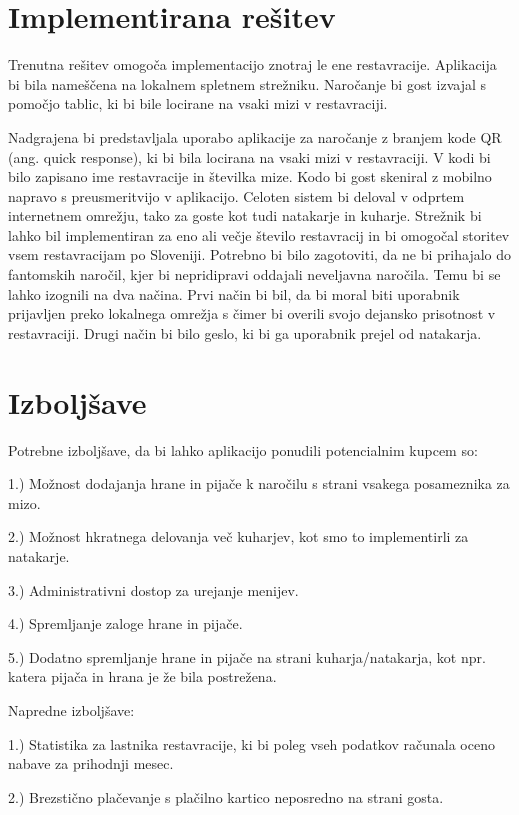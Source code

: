 \documentclass[a4paper, 12pt]{book}
\begin{document}
\section{Implementirana rešitev}

Trenutna rešitev omogoča implementacijo znotraj le ene restavracije. Aplikacija bi bila nameščena na lokalnem spletnem strežniku. Naročanje bi gost izvajal s pomočjo tablic, ki bi bile locirane na vsaki mizi v restavraciji. 

Nadgrajena bi predstavljala uporabo aplikacije za naročanje z branjem kode QR (ang. quick response), ki bi bila locirana na vsaki mizi v restavraciji. V kodi bi bilo zapisano ime restavracije in številka mize. Kodo bi gost skeniral z mobilno napravo s preusmeritvijo v aplikacijo. Celoten sistem bi deloval v odprtem internetnem omrežju, tako za goste kot tudi natakarje in kuharje. Strežnik bi lahko bil implementiran za eno ali večje število restavracij in bi omogočal storitev vsem restavracijam po Sloveniji. Potrebno bi bilo zagotoviti, da ne bi prihajalo do fantomskih naročil, kjer bi nepridipravi oddajali neveljavna naročila. Temu bi se lahko izognili na dva načina. Prvi način bi bil, da bi moral biti uporabnik prijavljen preko lokalnega omrežja s čimer bi overili svojo dejansko prisotnost v restavraciji.
Drugi način bi bilo geslo, ki bi ga uporabnik prejel od natakarja. 


\section{Izboljšave}

Potrebne izboljšave, da bi lahko aplikacijo ponudili potencialnim kupcem so:

1.) Možnost dodajanja hrane in pijače k naročilu s strani vsakega posameznika za mizo.

2.) Možnost hkratnega delovanja več kuharjev, kot smo to implementirli za natakarje.

3.) Administrativni dostop za urejanje menijev.

4.) Spremljanje zaloge hrane in pijače.

5.) Dodatno spremljanje hrane in pijače na strani kuharja/natakarja, kot npr. katera pijača in hrana je že bila postrežena.


Napredne izboljšave: 

1.) Statistika za lastnika restavracije, ki bi poleg vseh podatkov računala oceno nabave za prihodnji mesec.

2.) Brezstično plačevanje s plačilno kartico neposredno na strani gosta.
\end{document}
